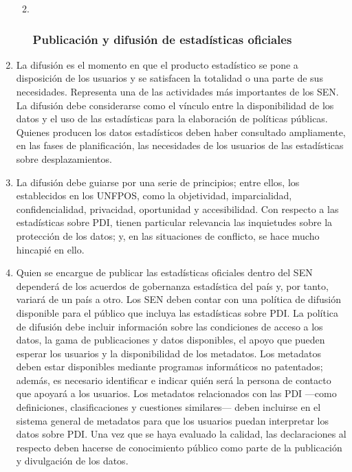 \documentclass[
]{book}
\begin{document}
\begin{enumerate}
  \begin{enumerate}
  \def\labelenumii{\arabic{enumii}.}
  \item ~
    \hypertarget{publicaciuxf3n-y-difusiuxf3n-de-estaduxedsticas-oficiales}{%
    \subsubsection{Publicación y difusión de estadísticas oficiales}\label{publicaciuxf3n-y-difusiuxf3n-de-estaduxedsticas-oficiales}}
  \end{enumerate}
\item
  La difusión es el momento en que el producto estadístico se pone a disposición de los usuarios y se satisfacen la totalidad o una parte de sus necesidades. Representa una de las actividades más importantes de los SEN. La difusión debe considerarse como el vínculo entre la disponibilidad de los datos y el uso de las estadísticas para la elaboración de políticas públicas. Quienes producen los datos estadísticos deben haber consultado ampliamente, en las fases de planificación, las necesidades de los usuarios de las estadísticas sobre desplazamientos.
\item
  La difusión debe guiarse por una serie de principios; entre ellos, los establecidos en los UNFPOS, como la objetividad, imparcialidad, confidencialidad, privacidad, oportunidad y accesibilidad. Con respecto a las estadísticas sobre PDI, tienen particular relevancia las inquietudes sobre la protección de los datos; y, en las situaciones de conflicto, se hace mucho hincapié en ello.
\item
  Quien se encargue de publicar las estadísticas oficiales dentro del SEN dependerá de los acuerdos de gobernanza estadística del país y, por tanto, variará de un país a otro. Los SEN deben contar con una política de difusión disponible para el público que incluya las estadísticas sobre PDI. La política de difusión debe incluir información sobre las condiciones de acceso a los datos, la gama de publicaciones y datos disponibles, el apoyo que pueden esperar los usuarios y la disponibilidad de los metadatos. Los metadatos deben estar disponibles mediante programas informáticos no patentados; además, es necesario identificar e indicar quién será la persona de contacto que apoyará a los usuarios. Los metadatos relacionados con las PDI ---como definiciones, clasificaciones y cuestiones similares--- deben incluirse en el sistema general de metadatos para que los usuarios puedan interpretar los datos sobre PDI. Una vez que se haya evaluado la calidad, las declaraciones al respecto deben hacerse de conocimiento público como parte de la publicación y divulgación de los datos.

\end{enumerate}
\end{document}

